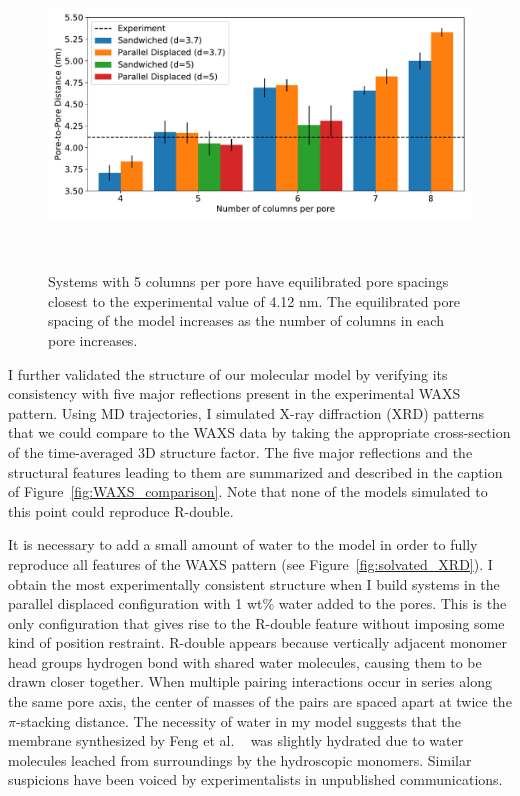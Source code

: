 \documentclass{article}
\begin{document}
  \begin{figure}
    \centering
    \vspace{-0.5cm}
    \includegraphics[width=\linewidth]{p2p.pdf}
    \caption{Systems with 5 columns per pore have equilibrated pore spacings
            closest to the experimental value of 4.12 nm. The equilibrated 
            pore spacing of the model increases as the number of columns in
            each pore increases.}~\label{fig:p2p}
    \vspace{-1.25cm}
  \end{figure}

  I further validated the structure of our molecular model by verifying 
  its consistency with five major reflections present in the experimental
  WAXS pattern. Using MD trajectories, I simulated X-ray diffraction (XRD)
  patterns that we could compare to the WAXS data by taking the appropriate
  cross-section of the time-averaged 3D structure factor. The five major 
  reflections and the structural features leading to them are summarized
  and described in the caption of Figure~\ref{fig:WAXS_comparison}. Note that
  none of the models simulated to this point could reproduce R-double.   
  
  It is necessary to add a small amount of water to the model in order to 
  fully reproduce all features of the WAXS pattern (see Figure~\ref{fig:solvated_XRD}).
  I obtain the most experimentally consistent structure when I build systems
  in the parallel displaced configuration with 1 wt\% water added to the pores. 
  This is the only configuration that gives rise to the R-double feature without
  imposing some kind of position restraint. R-double appears because 
  vertically adjacent monomer head groups hydrogen bond with shared water molecules,
  causing them to be drawn closer together. When multiple pairing interactions
  occur in series along the same pore axis, the center of masses of the pairs 
  are spaced apart at twice the $\pi$-stacking distance. The necessity of water
  in my model suggests that the membrane synthesized by Feng et al.
  ~\cite{feng_scalable_2014,feng_thin_2016} was slightly hydrated due to water 
  molecules leached from surroundings by the hydroscopic monomers. Similar 
  suspicions have been voiced by experimentalists in unpublished communications.
  
\end{document}
